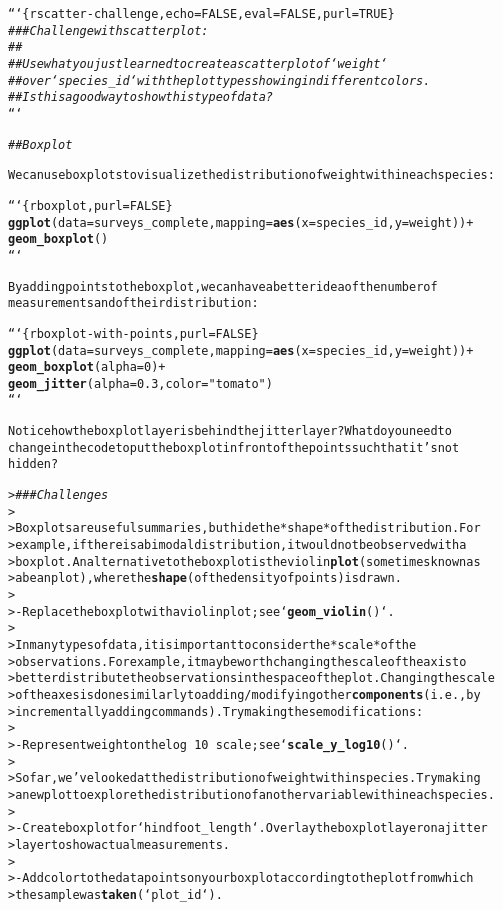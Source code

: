 \documentclass{article}\usepackage[]{graphicx}\usepackage[]{xcolor}
\makeatletter
\newcommand{\hlstr}[1]{\textcolor[rgb]{0.192,0.494,0.8}{#1}}%
\newcommand{\hlcom}[1]{\textcolor[rgb]{0.678,0.584,0.686}{\textit{#1}}}%
\newcommand{\hlkwd}[1]{\textcolor[rgb]{0.737,0.353,0.396}{\textbf{#1}}}%
\newenvironment{kframe}{%
 \def\at@end@of@kframe{}%
 \ifinner\ifhmode%
  \def\at@end@of@kframe{\end{minipage}}%
  \begin{minipage}{\columnwidth}%
 \fi\fi%
 \def\FrameCommand##1{\hskip\@totalleftmargin \hskip-\fboxsep
 \colorbox{shadecolor}{##1}\hskip-\fboxsep
     \hskip-\linewidth \hskip-\@totalleftmargin \hskip\columnwidth}%
 \MakeFramed {\advance\hsize-\width
   \@totalleftmargin\z@ \linewidth\hsize
   \@setminipage}}%
 {\par\unskip\endMakeFramed%
 \at@end@of@kframe}
\newenvironment{knitrout}{}{} %
\makeatother
\begin{document}
\begin{knitrout}
\begin{kframe}
\begin{alltt}
```\{r scatter-challenge, echo = FALSE, eval = FALSE, purl = TRUE\}
\hlcom{### Challenge with scatter plot:}
\hlcom{##}
\hlcom{##  Use what you just learned to create a scatter plot of `weight`}
\hlcom{## over `species_id` with the plot types showing in different colors.}
\hlcom{## Is this a good way to show this type of data?}
```

\hlcom{## Boxplot}

We can use boxplots to visualize the distribution of weight within each species:

```\{r boxplot, purl=FALSE\}
\hlkwd{ggplot}(data = surveys_complete, mapping = \hlkwd{aes}(x = species_id, y = weight)) +
    \hlkwd{geom_boxplot}()
```

By adding points to the boxplot, we can have a better idea of the number of
measurements and of their distribution:

```\{r boxplot-with-points, purl=FALSE\}
\hlkwd{ggplot}(data = surveys_complete, mapping = \hlkwd{aes}(x = species_id, y = weight)) +
    \hlkwd{geom_boxplot}(alpha = 0) +
    \hlkwd{geom_jitter}(alpha = 0.3, color = \hlstr{"tomato"})
```

Notice how the boxplot layer is behind the jitter layer? What do you need to
change in the code to put the boxplot in front of the points such that it's not
hidden?

> \hlcom{### Challenges}
>
> Boxplots are useful summaries, but hide the *shape* of the distribution. For
> example, if there is a bimodal distribution, it would not be observed with a
> boxplot. An alternative to the boxplot is the violin \hlkwd{plot} (sometimes known as
> a beanplot), where the \hlkwd{shape} (of the density of points) is drawn.
>
> - Replace the box plot with a violin plot; see `\hlkwd{geom_violin}()`.
>
> In many types of data, it is important to consider the *scale* of the
> observations.  For example, it may be worth changing the scale of the axis to
> better distribute the observations in the space of the plot.  Changing the scale
> of the axes is done similarly to adding/modifying other \hlkwd{components} (i.e., by
> incrementally adding commands). Try making these modifications:
>
> - Represent weight on the log~10~ scale; see `\hlkwd{scale_y_log10}()`.
>
> So far, we've looked at the distribution of weight within species. Try making
> a new plot to explore the distribution of another variable within each species.
>
> - Create boxplot for `hindfoot_length`.  Overlay the boxplot layer on a jitter
>   layer to show actual measurements.
>
> - Add color to the data points on your boxplot according to the plot from which
>   the sample was \hlkwd{taken} (`plot_id`).


\end{alltt}
\end{kframe}
\end{knitrout}
\end{document}
